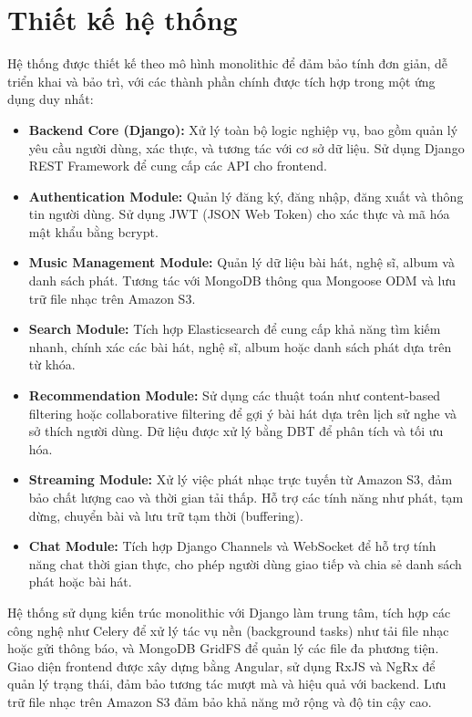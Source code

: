 \documentclass[a4paper,12pt]{report}
\begin{document}
\section{Thiết kế hệ thống}
Hệ thống được thiết kế theo mô hình monolithic để đảm bảo tính đơn giản, dễ triển khai và bảo trì, với các thành phần chính được tích hợp trong một ứng dụng duy nhất:

\begin{itemize}
    \item \textbf{Backend Core (Django):} Xử lý toàn bộ logic nghiệp vụ, bao gồm quản lý yêu cầu người dùng, xác thực, và tương tác với cơ sở dữ liệu. Sử dụng Django REST Framework để cung cấp các API cho frontend.
    \item \textbf{Authentication Module:} Quản lý đăng ký, đăng nhập, đăng xuất và thông tin người dùng. Sử dụng JWT (JSON Web Token) cho xác thực và mã hóa mật khẩu bằng bcrypt.
    \item \textbf{Music Management Module:} Quản lý dữ liệu bài hát, nghệ sĩ, album và danh sách phát. Tương tác với MongoDB thông qua Mongoose ODM và lưu trữ file nhạc trên Amazon S3.
    \item \textbf{Search Module:} Tích hợp Elasticsearch để cung cấp khả năng tìm kiếm nhanh, chính xác các bài hát, nghệ sĩ, album hoặc danh sách phát dựa trên từ khóa.
    \item \textbf{Recommendation Module:} Sử dụng các thuật toán như content-based filtering hoặc collaborative filtering để gợi ý bài hát dựa trên lịch sử nghe và sở thích người dùng. Dữ liệu được xử lý bằng DBT để phân tích và tối ưu hóa.
    \item \textbf{Streaming Module:} Xử lý việc phát nhạc trực tuyến từ Amazon S3, đảm bảo chất lượng cao và thời gian tải thấp. Hỗ trợ các tính năng như phát, tạm dừng, chuyển bài và lưu trữ tạm thời (buffering).
    \item \textbf{Chat Module:} Tích hợp Django Channels và WebSocket để hỗ trợ tính năng chat thời gian thực, cho phép người dùng giao tiếp và chia sẻ danh sách phát hoặc bài hát.
\end{itemize}

Hệ thống sử dụng kiến trúc monolithic với Django làm trung tâm, tích hợp các công nghệ như Celery để xử lý tác vụ nền (background tasks) như tải file nhạc hoặc gửi thông báo, và MongoDB GridFS để quản lý các file đa phương tiện. Giao diện frontend được xây dựng bằng Angular, sử dụng RxJS và NgRx để quản lý trạng thái, đảm bảo tương tác mượt mà và hiệu quả với backend. Lưu trữ file nhạc trên Amazon S3 đảm bảo khả năng mở rộng và độ tin cậy cao.
\end{document}
